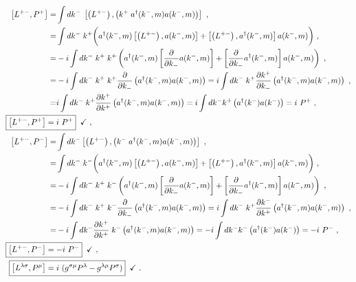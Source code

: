 \documentclass[12pt,a4paper]{report}
\begin{document}
    \begin{align}
          \left[L^{+-},P^+\right]=& \int dk^- \; \left[\left (L^{+-}\right),\left (k^+\;a^{\dagger}(k^-,m)a(k^-,m)\right)\right]\nonumber~,\\
          =&\int dk^- \; k^+\bigg(a^{\dagger}(k^-,m)\left[\left (L^{+-}\right),a(k^-,m)\right]+\left[\left (L^{+-}\right),a^{\dagger}(k^-,m)\right]a(k^-,m)\bigg)\nonumber~,\\
          =&-i\int dk^- \;k^+\; k^+\left(a^{\dagger}(k^-,m)\left[\frac{\partial}{\partial k_-}a(k^-,m)\right]+\left[\frac{\partial}{\partial k_-}a^{\dagger}(k^-,m)\right]a(k^-,m)\right)\nonumber~,\\
          =&-i\int dk^- \;k^+\; k^+\frac{\partial}{\partial k_-}\left(a^{\dagger}(k^-,m)a(k^-,m)\right)=i\int dk^- \; k^+\frac{\partial k^+}{\partial k_-}\left(a^{\dagger}(k^-,m)a(k^-,m)\right)\nonumber~,\\
          =&i\int dk^- \; k^+\frac{\partial k^+}{\partial k^+}\left(a^{\dagger}(k^-,m)a(k^-,m)\right)=i\int dk^- k^+ \left(a^{\dagger}(k^-)a(k^-)\right)=i~P^+\nonumber~,\\
          \Aboxed{\left[L^{+-},P^+\right]=&i~P^+}\;\;\checkmark\nonumber~,\\ \left[L^{+-},P^-\right]=& \int dk^- \left[\left (L^{+-}\right),\left (k^-\;a^{\dagger}(k^-,m)a(k^-,m)\right)\right]\nonumber~,\\
          =&\int dk^- \; k^-\bigg(a^{\dagger}(k^-,m)\left[\left (L^{+-}\right),a(k^-,m)\right]+\left[\left (L^{+-}\right),a^{\dagger}(k^-,m)\right]a(k^-,m)\bigg)\nonumber~,\\
          =&-i\int dk^- \;k^+\; k^-\left(a^{\dagger}(k^-,m)\left[\frac{\partial}{\partial k_-}a(k^-,m)\right]+\left[\frac{\partial}{\partial k_-}a^{\dagger}(k^-,m)\right]a(k^-,m)\right)\nonumber~,\\
          =&-i\int dk^- \;k^+\; k^-\frac{\partial}{\partial k_-}\left(a^{\dagger}(k^-,m)a(k^-,m)\right)=i\int dk^- \; k^+\frac{\partial k^-}{\partial k^+}\left(a^{\dagger}(k^-,m)a(k^-,m)\right)\nonumber~,\\
          =&-i\int dk^- \frac{\partial k^+}{\partial k^+}\; k^-\left(a^{\dagger}(k^-,m)a(k^-,m)\right)=-i\int dk^- k^- \left(a^{\dagger}(k^-)a(k^-)\right)=-i~P^-\nonumber~,\\
          \Aboxed{\left[L^{+-},P^-\right]=&-i~P^-}\;\;\checkmark\nonumber~,\\
          \Aboxed{\left[L^{\lambda\sigma},P^\mu\right]=&i~(g^{\sigma\mu}P^\lambda-g^{\lambda\mu}P^\sigma)}\;\;\checkmark~.
      \end{align}
  
\end{document}
